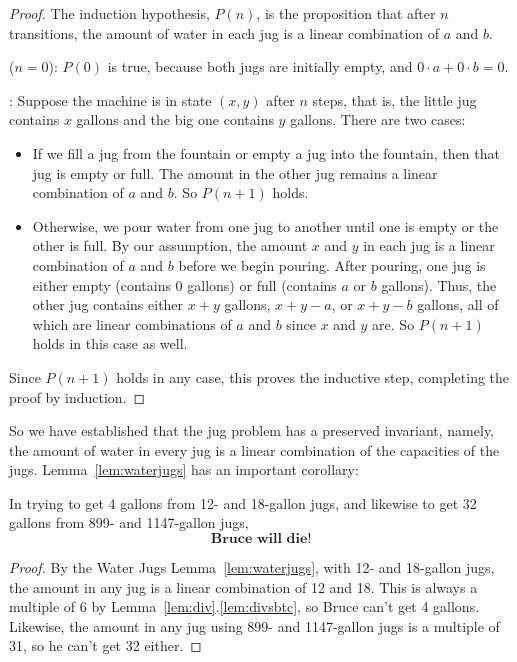 \begin{proof}
The induction hypothesis, $P(n)$, is the proposition that after $n$
transitions, the amount of water in each jug is a linear combination
of $a$ and $b$.

 ($n = 0$): $P(0)$ is true, because both jugs
are initially empty, and $0 \cdot a + 0 \cdot b = 0$.

: Suppose the machine is in state
$(x,y)$ after $n$ steps, that is, the little jug contains $x$ gallons
and the big one contains $y$ gallons.  There are two cases:

\begin{itemize}

\item If we fill a jug from the fountain or empty a jug into the
  fountain, then that jug is empty or full.  The amount in the other
  jug remains a linear combination of $a$ and $b$.  So $P(n+1)$ holds.

\item Otherwise, we pour water from one jug to another until one is
  empty or the other is full.  By our assumption, the amount $x$ and
  $y$ in each jug is a linear combination of $a$ and $b$ before we
  begin pouring.  After pouring, one jug is either empty (contains 0
  gallons) or full (contains $a$ or $b$ gallons).  Thus, the other jug
  contains either $x + y$ gallons, $x + y - a$, or $x + y - b$
  gallons, all of which are linear combinations of $a$ and $b$ since
  $x$ and $y$ are.  So $P(n+1)$ holds in this case as well.
\end{itemize}
Since $P(n+1)$ holds in any case, this proves the inductive step,
completing the proof by induction.
\end{proof}

So we have established that the jug problem has a preserved invariant,
namely, the amount of water in every jug is a linear combination of
the capacities of the jugs.  Lemma~\ref{lem:waterjugs} has an
important corollary:
\begin{corollary*}
In trying to get 4 gallons from 12- and 18-gallon jugs, and likewise
to get 32 gallons from 899- and 1147-gallon jugs,
\[
\textbf{Bruce will die!}
\]
\end{corollary*}

\begin{proof}
By the Water Jugs Lemma~\ref{lem:waterjugs}, with 12- and 18-gallon
jugs, the amount in any jug is a linear combination of 12 and 18.
This is always a multiple of 6 by
Lemma~\ref{lem:div}.\ref{lem:divsbtc}, so Bruce can't get 4 gallons.
Likewise, the amount in any jug using 899- and 1147-gallon jugs is a
multiple of 31, so he can't get 32 either.
\end{proof}

